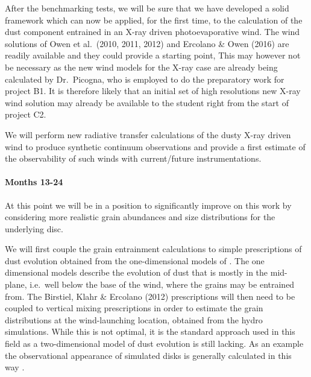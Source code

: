 \documentclass[10pt,fleqn,twoside]{article}
\begin{document}
After the benchmarking tests, we will be sure that we have developed a
solid framework which can now be applied, for the
first time, to the calculation of the dust component entrained in an
X-ray driven photoevaporative wind. The wind solutions of Owen et
al.\ (2010, 2011, 2012) and Ercolano \& Owen (2016) are readily
available and they could provide a starting point,  This may however
not be necessary as the new wind models for the X-ray case
are already being calculated by Dr.\ Picogna, who is employed to do the
preparatory work for project B1. It is therefore likely that an
initial set of high resolutions new X-ray wind solution may already be
available to the student right from the start of project C2.
 

We will perform new radiative transfer calculations of the dusty
X-ray driven wind to produce synthetic continuum observations and
provide a first estimate of the observability of such winds with
current/future instrumentations. 

\paragraph{Months 13-24}
 
At this point we will be in a position to significantly improve on
this work by considering more realistic grain abundances and size
distributions for the underlying disc. 

We will first couple the grain entrainment calculations to simple
prescriptions of dust  evolution \citep[e.g.,][]{2012A&A...539A.148B}
obtained from the one-dimensional models of
\citet{2010A&A...513A..79B}. The one dimensional models describe the
evolution of dust that is mostly in the mid-plane, i.e.\ well below the
base of the wind, where the grains may be entrained from. The
Birstiel, Klahr \& Ercolano (2012) prescriptions will then need to be
coupled to vertical mixing prescriptions \citep{2009A&A...496..597F} in order to
estimate the grain distributions at the wind-launching location,
obtained from the hydro simulations. While this is not optimal, it is
the standard approach used in this field as a two-dimensional model of
dust evolution is still lacking. As an example the observational
appearance of simulated disks is generally calculated in this way
\citep[e.g.,][]{2015ApJ...813L..14B}. 
\end{document}
